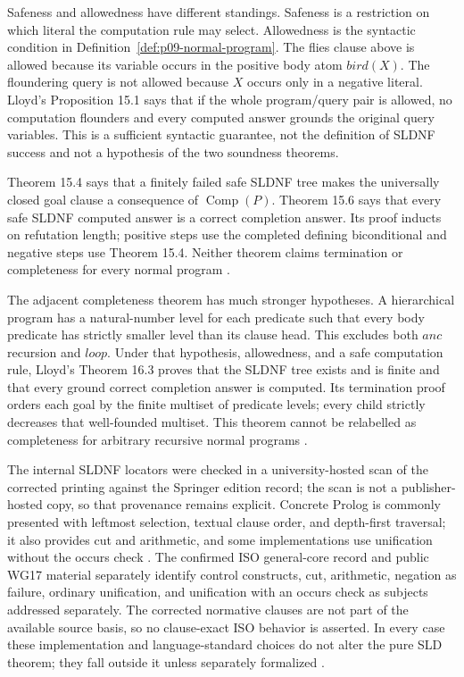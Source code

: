 Safeness and allowedness have different standings.  Safeness is a restriction
on which literal the computation rule may select.  Allowedness is the syntactic
condition in Definition~\ref{def:p09-normal-program}.  The flies clause above
is allowed because its variable occurs in the positive body atom \(bird(X)\).
The floundering query is not allowed because \(X\) occurs only in a negative
literal.  Lloyd's Proposition 15.1 says that if the whole program/query pair is
allowed, no computation flounders and every computed answer grounds the
original query variables.  This is a sufficient syntactic guarantee, not the
definition of SLDNF success and not a hypothesis of the two soundness theorems.

Theorem 15.4 says that a finitely failed safe SLDNF tree makes the universally
closed goal clause a consequence of \(\operatorname{Comp}(P)\).  Theorem 15.6
says that every safe SLDNF computed answer is a correct completion answer.  Its
proof inducts on refutation length; positive steps use the completed defining
biconditional and negative steps use Theorem 15.4.  Neither theorem claims
termination or completeness for every normal program
\cite[\S15, prop.~15.1 and thms.~15.4, 15.6]{Lloyd1987}.

The adjacent completeness theorem has much stronger hypotheses.  A
hierarchical program has a natural-number level for each predicate such that
every body predicate has strictly smaller level than its clause head.  This
excludes both \(anc\) recursion and \(loop\).  Under that hypothesis,
allowedness, and a safe computation rule, Lloyd's Theorem 16.3 proves that the
SLDNF tree exists and is finite and that every ground correct completion answer
is computed.  Its termination proof orders each goal by the finite multiset of
predicate levels; every child strictly decreases that well-founded multiset.
This theorem cannot be relabelled as completeness for arbitrary recursive
normal programs \cite[thm.~16.3]{Lloyd1987}.

The internal SLDNF locators were checked in a university-hosted scan of the
corrected printing against the Springer edition record; the scan is not a
publisher-hosted copy, so that provenance remains explicit.  Concrete Prolog
is commonly presented with leftmost selection, textual clause order, and
depth-first traversal; it also provides cut and arithmetic, and some
implementations use unification without the occurs check \cite{Lloyd1987}.
The confirmed ISO
general-core record and public WG17 material separately identify control
constructs, cut, arithmetic, negation as failure, ordinary unification, and
unification with an occurs check as subjects addressed separately.  The
corrected normative clauses are not part of the available source basis, so no
clause-exact ISO behavior is asserted.  In every case these implementation and
language-standard choices do not alter the pure SLD theorem; they fall outside it unless separately
formalized \cite{ISO13211-1-1995}.
